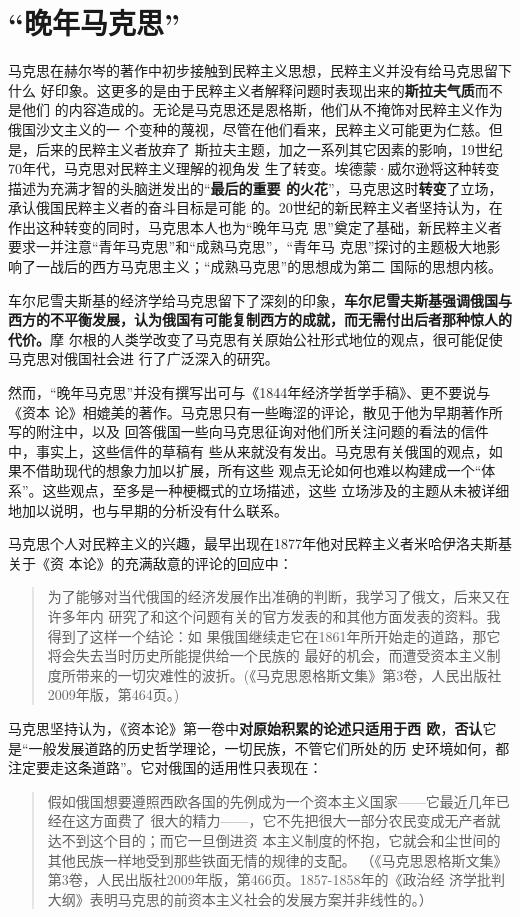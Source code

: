 \section{“晚年马克思”}
马克思在赫尔岑的著作中初步接触到民粹主义思想，民粹主义并没有给马克思留下什么
好印象。这更多的是由于民粹主义者解释问题时表现出来的\textbf{斯拉夫气质}而不是他们
的内容造成的。无论是马克思还是恩格斯，他们从不掩饰对民粹主义作为俄国沙文主义的一
个变种的蔑视，尽管在他们看来，民粹主义可能更为仁慈。但是，后来的民粹主义者放弃了
斯拉夫主题，加之一系列其它因素的影响，19世纪70年代，马克思对民粹主义理解的视角发
生了转变。埃德蒙·威尔逊将这种转变描述为充满才智的头脑迸发出的“\textbf{最后的重要
  的火花}”，马克思这时\textbf{转变}了立场，承认俄国民粹主义者的奋斗目标是可能
的。20世纪的新民粹主义者坚持认为，在作出这种转变的同时，马克思本人也为“晚年马克
思”奠定了基础，新民粹主义者要求一并注意“青年马克思”和“成熟马克思”，“青年马
克思”探讨的主题极大地影响了一战后的西方马克思主义；“成熟马克思”的思想成为第二
国际的思想内核。

车尔尼雪夫斯基的经济学给马克思留下了深刻的印象，\textbf{车尔尼雪夫斯基强调俄国与
  西方的不平衡发展，认为俄国有可能复制西方的成就，而无需付出后者那种惊人的代价。}摩
尔根的人类学改变了马克思有关原始公社形式地位的观点，很可能促使马克思对俄国社会进
行了广泛深入的研究。

然而，“晚年马克思”并没有撰写出可与《1844年经济学哲学手稿》、更不要说与《资本
论》相媲美的著作。马克思只有一些晦涩的评论，散见于他为早期著作所写的附注中，以及
回答俄国一些向马克思征询对他们所关注问题的看法的信件中，事实上，这些信件的草稿有
些从来就没有发出。马克思有关俄国的观点，如果不借助现代的想象力加以扩展，所有这些
观点无论如何也难以构建成一个“体系”。这些观点，至多是一种梗概式的立场描述，这些
立场涉及的主题从未被详细地加以说明，也与早期的分析没有什么联系。

马克思个人对民粹主义的兴趣，最早出现在1877年他对民粹主义者米哈伊洛夫斯基关于《资
本论》的充满敌意的评论的回应中：
\begin{quotation}
  为了能够对当代俄国的经济发展作出准确的判断，我学习了俄文，后来又在许多年内
  研究了和这个问题有关的官方发表的和其他方面发表的资料。我得到了这样一个结论：如
  果俄国继续走它在1861年所开始走的道路，那它将会失去当时历史所能提供给一个民族的
  最好的机会，而遭受资本主义制度所带来的一切灾难性的波折。(《马克思恩格斯文集》第3卷，人民出版社2009年版，第464页。)
\end{quotation}

马克思坚持认为，《资本论》第一卷中\textbf{对原始积累的论述只适用于西
  欧}，\textbf{否认}它是“一般发展道路的历史哲学理论，一切民族，不管它们所处的历
史环境如何，都注定要走这条道路”。它对俄国的适用性只表现在：
\begin{quotation}
  假如俄国想要遵照西欧各国的先例成为一个资本主义国家——它最近几年已经在这方面费了
  很大的精力——，它不先把很大一部分农民变成无产者就达不到这个目的；而它一旦倒进资
  本主义制度的怀抱，它就会和尘世间的其他民族一样地受到那些铁面无情的规律的支配。
  （《马克思恩格斯文集》第3卷，人民出版社2009年版，第466页。1857-1858年的《政治经
  济学批判大纲》表明马克思的前资本主义社会的发展方案并非线性的。）
\end{quotation}

